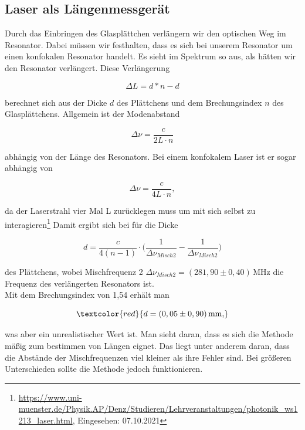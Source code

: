  \subsection*{Laser als Längenmessgerät}

 Durch das Einbringen des Glasplättchen verlängern wir den optischen Weg im Resonator. Dabei müssen wir 
 festhalten, dass es sich bei unserem Resonator um einen konfokalen Resonator handelt. Es sieht im Spektrum so aus, 
 als hätten wir den Resonator verlängert. Diese Verlängerung 

 \begin{equation*}
     \Delta L = d*n - d
 \end{equation*}

 berechnet sich aus der Dicke $d$ des Plättchens und dem Brechungsindex $n$ des Glasplättchens. Allgemein ist der 
 Modenabstand 
 
 \begin{equation*}
     \Delta\nu = \frac{c}{2L\cdot n}
 \end{equation*}

 abhängig von der Länge des Resonators. Bei einem konfokalem Laser ist er sogar abhängig von 

 \begin{equation*}
    \Delta\nu = \frac{c}{4L\cdot n},
\end{equation*}

da der Laserstrahl vier Mal L zurücklegen muss um mit sich selbst zu interagieren\footnote{\url{https://www.uni-muenster.de/Physik.AP/Denz/Studieren/Lehrveranstaltungen/photonik_ws1213_laser.html}, Eingesehen: 07.10.2021}
Damit ergibt sich bei für die Dicke 

\begin{equation}
    d = \frac{c}{4(n-1)}\cdot \biggl( \frac{1}{\Delta\nu_{Misch2}}-\frac{1}{\Delta\nu_{Misch2}} \biggl)
\end{equation}


des Plättchens, wobei Mischfrequenz 2 $\Delta \nu_{Misch2} = (281,90\pm0,40)\,\mathrm{MHz}$ die Frequenz des verlängerten Resonators ist. \\
Mit dem Brechungsindex von 1,54 \cite[S.1358]{Chemie1949} erhält man 

\begin{equation}
    \textcolor{red}{d = (0,05 \pm 0,90)\,\mathrm{mm,}}
\end{equation}

was aber ein unrealistischer Wert ist. Man sieht daran, dass es sich die Methode mäßig zum bestimmen von Längen eignet. Das liegt unter anderem daran, dass die
Abstände der Mischfrequenzen viel kleiner als ihre Fehler sind. Bei größeren Unterschieden sollte die Methode jedoch funktionieren. 